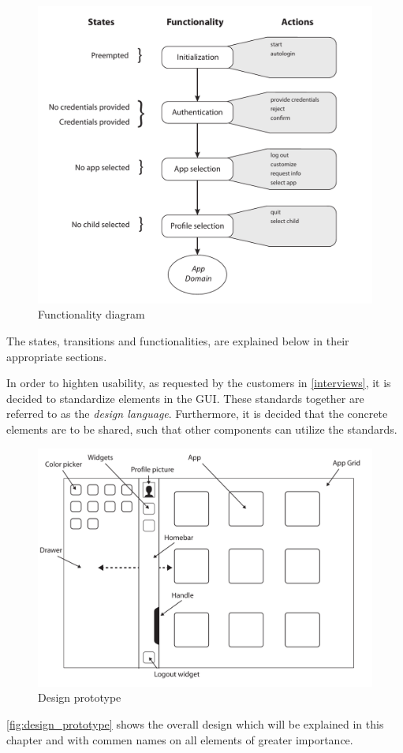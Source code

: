 \begin{figure}[h!]
	\centering
	\includegraphics[width=1\textwidth]{gfx/design_diagram.pdf}
	\caption{Functionality diagram}
	\label{fig:design_diagram}
\end{figure}

The states, transitions and functionalities, are explained below in their appropriate sections.

In order to highten usability, as requested by the customers in \autoref{interviews}, it is decided to standardize elements in the GUI. These standards together are referred to as the \emph{design language}.
Furthermore, it is decided that the concrete elements are to be shared, such that other \giraf[] components can utilize the standards.

\begin{figure}[h!]
	\centering
	\includegraphics[width=1\textwidth]{gfx/design_prototype.pdf}
	\caption{Design prototype}
	\label{fig:design_prototype}
\end{figure}

\autoref{fig:design_prototype} shows the overall design which will be explained in this chapter and with commen names on all elements of greater importance.